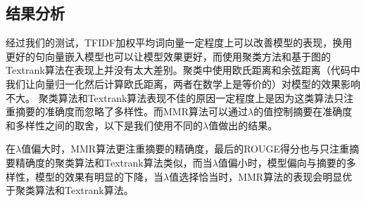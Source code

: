 \documentclass[10pt,twocolumn,letterpaper]{article}
\begin{document}
	\subsection{结果分析}	
	经过我们的测试，TFIDF加权平均词向量一定程度上可以改善模型的表现，换用更好的句向量嵌入模型也可以让模型效果更好，而使用聚类方法和基于图的Textrank算法在表现上并没有太大差别。聚类中使用欧氏距离和余弦距离（代码中我们让向量归一化然后计算欧氏距离，两者在数学上是等价的）对模型的效果影响不大。
	聚类算法和Textrank算法表现不佳的原因一定程度上是因为这类算法只注重摘要的准确度而忽略了多样性。而MMR算法可以通过$\lambda$的值控制摘要在准确度和多样性之间的取舍，以下是我们使用不同的$\lambda$值做出的结果。
	\begin{center}\footnotesize
	\end{center}

	在$\lambda$值偏大时，MMR算法更注重摘要的精确度，最后的ROUGE得分也与只注重摘要精确度的聚类算法和Textrank算法类似，而当$\lambda$值偏小时，模型偏向与摘要的多样性，模型的效果有明显的下降，当$\lambda$值选择恰当时，MMR算法的表现会明显优于聚类算法和Textrank算法。
	
\end{document}
